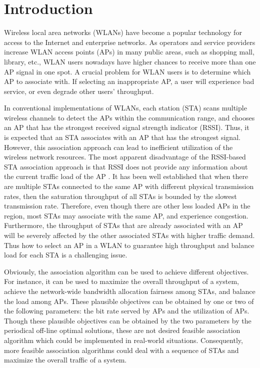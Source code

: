 \documentclass[conference]{IEEEtran}
\begin{document}
\section{Introduction}
 Wireless local area networks (WLANs) have become a popular technology for access to the Internet and enterprise networks. As operators and service providers increase WLAN access points (APs) in many public areas, such as shopping mall, library, etc., WLAN users nowadays have higher chances to receive more than one AP signal in one spot. A crucial problem for WLAN users is to determine which AP to associate with. If selecting an inappropriate AP, a user will experience bad service, or even degrade other users' throughput.

  In conventional implementations of WLANs, each station (STA) scans multiple wireless channels to detect the APs within the communication range, and chooses an AP that has the strongest received signal strength indicator (RSSI). Thus, it is expected that an STA associates with an AP that has the strongest signal. However, this association approach can lead to inefficient utilization of the wireless network resources. The most apparent disadvantage of the RSSI-based STA association approach is that RSSI does not provide any information about the current traffic load of the AP \cite{he2010design}. It has been well established that when there are multiple STAs connected to the same AP with different physical transmission rates, then the saturation throughput of all STAs is bounded by the slowest transmission rate. Therefore, even though there are other less loaded APs in the region, most STAs may associate with the same AP, and experience congestion\cite{xu2010designing}. Furthermore, the throughput of STAs that are already associated with an AP will be severely affected by the other associated STAs with higher traffic demand. Thus how to select an AP in a WLAN to guarantee high throughput and balance load for each STA is a challenging issue\cite{kim2010alpha}.

  Obviously, the association algorithm can be used to achieve different objectives.  For instance, it can be used to maximize the overall throughput of a system\cite{nassiri2008novel}, achieve the network-wide bandwidth allocation fairness among STAs\cite{bredel2009understanding}, and balance the load among APs.  These plausible objectives can be obtained by one or two of the following parameters: the bit rate served by APs and the utilization of APs.  Though these plausible objectives can be obtained by the two parameters by the periodical off-line optimal solutions, these are not desired feasible association algorithm which could be implemented in real-world situations.  Consequently, more feasible association algorithms could deal with a sequence of STAs and maximize the overall traffic of a system.
\end{document}
